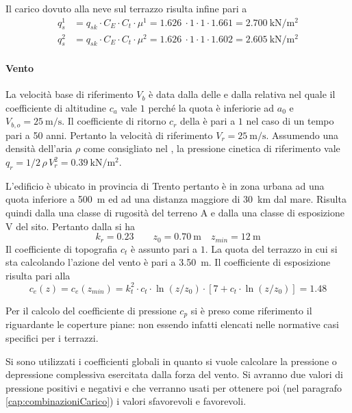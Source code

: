 Il carico dovuto alla neve sul terrazzo risulta infine pari a 
\begin{align}
q_s^1 &= q_{sk} \cdot C_E \cdot C_t \cdot \mu^1 = \SI{1.626}{} \cdot 1 \cdot 1 \cdot 1.661 = \SI{2.700}{\kilo\newton\per\square\meter}\\
q_s^2 &= q_{sk} \cdot C_E \cdot C_t \cdot \mu^2 = \SI{1.626}{} \cdot 1 \cdot 1 \cdot 1.602 = \SI{2.605}{\kilo\newton\per\square\meter}\label{eq:qneve}
\end{align}
\paragraph*{Vento} \label{cap:ventoTerrazzo} 
La velocità base di riferimento $V_b$ è data dalla  delle  e dalla relativa  nel quale il coefficiente di altitudine $c_a$ vale $1$ perché la quota è inferiorie ad $a_0$ e $V_{b,o}=\SI{25}{\meter\per\second}$. 
Il coefficiente di ritorno $c_r$ della  è pari a $1$ nel caso di un tempo pari a 50 anni. 
Pertanto la velocità di riferimento $V_r=\SI{25}{\meter\per\second}$.
Assumendo una densità dell'aria $\rho$ come consigliato nel , la pressione cinetica di riferimento vale $q_r =1/2\, \rho\, V_r^2 = \SI{0.39}{\kilo\newton\per\square\meter}$. 

L'edificio è ubicato in provincia di Trento pertanto è in zona urbana ad una quota inferiore a \SI{500}{\meter} ed ad una distanza maggiore di \SI{30}{\kilo\meter} dal mare. 
Risulta quindi dalla  una classe di rugosità del terreno A e dalla  una classe di esposizione V del sito.
Pertanto dalla  si ha
\[
	k_r=0.23 \qquad z_0=\SI{0.70}{\meter} \quad z_{min}=\SI{12}{\meter}
\]
Il coefficiente di topografia $c_t$ è assunto pari a $1$.
La quota del terrazzo in cui si sta calcolando l'azione del vento è pari a \SI{3.50}{\meter}.
Il coefficiente di esposizione risulta pari alla  
\[
	c_e(z)=c_e(z_{min})=k_t^2\cdot c_t \cdot \ln(z/z_0)\cdot[7+c_t\cdot\ln (z/z_0)] = 1.48
\]

Per il calcolo del coefficiente di pressione $c_p$ si è preso come riferimento il  riguardante le coperture piane: non essendo infatti elencati nelle normative casi specifici per i terrazzi.

Si sono utilizzati i coefficienti globali in quanto si vuole calcolare la pressione o depressione complessiva esercitata dalla forza del vento. 
Si avranno due valori di pressione positivi e negativi e che verranno usati per ottenere poi (nel paragrafo \ref{cap:combinazioniCarico}) i valori sfavorevoli e favorevoli.

